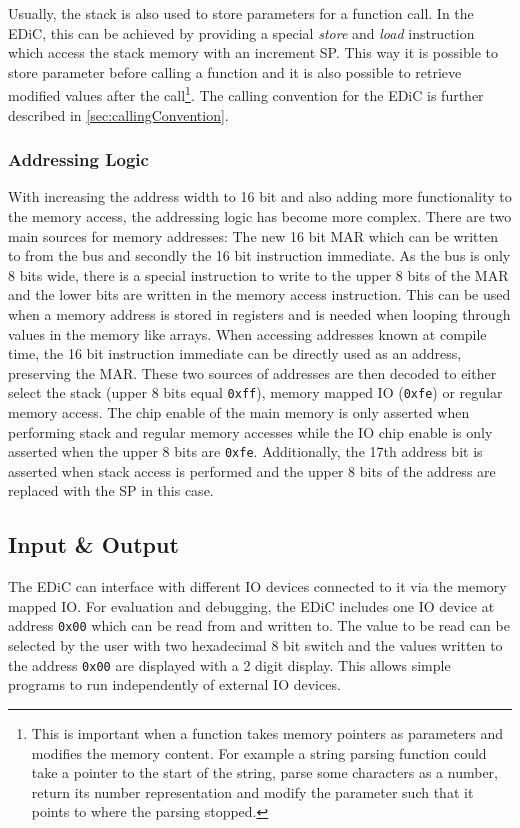 Usually, the stack is also used to store parameters for a function call.
In the \gls{EDiC}, this can be achieved by providing a special \emph{store} and \emph{load} instruction which access the stack memory with an increment \gls{SP}.
This way it is possible to store parameter before calling a function and it is also possible to retrieve modified values after the call\footnote{This is important when a function takes memory pointers as parameters and modifies the memory content. For example a string parsing function could take a pointer to the start of the string, parse some characters as a number, return its number representation and modify the parameter such that it points to where the parsing stopped.}.
The calling convention for the \gls{EDiC} is further described in \cref{sec:callingConvention}.

\subsubsection{Addressing Logic}\label{sec:addrLogic}
With increasing the address width to 16 bit and also adding more functionality to the memory access, the addressing logic has become more complex.
There are two main sources for memory addresses: The new 16 bit \gls{MAR} which can be written to from the bus and secondly the 16 bit instruction immediate.
As the bus is only 8 bits wide, there is a special instruction to write to the upper 8 bits of the \gls{MAR} and the lower bits are written in the memory access instruction.
This can be used when a memory address is stored in registers and is needed when looping through values in the memory like arrays.
When accessing addresses known at compile time, the 16 bit instruction immediate can be directly used as an address, preserving the \gls{MAR}.
These two sources of addresses are then decoded to either select the stack (upper 8 bits equal \texttt{0xff}), memory mapped \gls{IO} (\texttt{0xfe}) or regular memory access.
The chip enable of the main memory is only asserted when performing stack and regular memory accesses while the \gls{IO} chip enable is only asserted when the upper 8 bits are \texttt{0xfe}.
Additionally, the 17th address bit is asserted when stack access is performed and the upper 8 bits of the address are replaced with the \gls{SP} in this case.

\subsection{Input \& Output}\label{sec:IO}
The \gls{EDiC} can interface with different \gls{IO} devices connected to it via the memory mapped \gls{IO}.
For evaluation and debugging, the \gls{EDiC} includes one \gls{IO} device at address \texttt{0x00} which can be read from and written to.
The value to be read can be selected by the user with two hexadecimal 8 bit switch and the values written to the address \texttt{0x00} are displayed with a 2 digit display.
This allows simple programs to run independently of external \gls{IO} devices.

